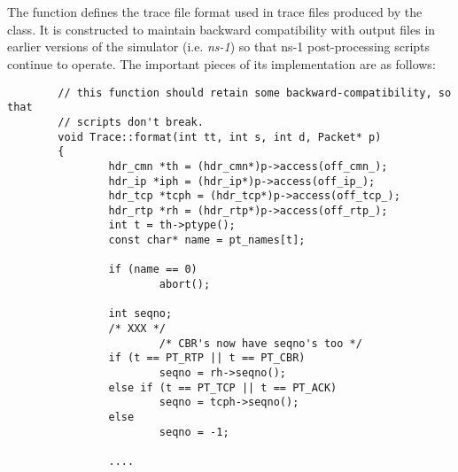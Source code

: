\section{}

The  function defines the trace file format used
in trace files produced by the  class.
It is constructed to maintain backward compatibility with output files
in earlier versions of the simulator (i.e. {\em ns-1}) so that ns-1
post-processing scripts continue to operate.
The important pieces of its implementation are as follows:
\begin{small}
\begin{verbatim}
        // this function should retain some backward-compatibility, so that
        // scripts don't break.
        void Trace::format(int tt, int s, int d, Packet* p)
        {
                hdr_cmn *th = (hdr_cmn*)p->access(off_cmn_);
                hdr_ip *iph = (hdr_ip*)p->access(off_ip_);
                hdr_tcp *tcph = (hdr_tcp*)p->access(off_tcp_);
                hdr_rtp *rh = (hdr_rtp*)p->access(off_rtp_);
                int t = th->ptype();
                const char* name = pt_names[t];

                if (name == 0)
                        abort();

                int seqno;
                /* XXX */
                        /* CBR's now have seqno's too */
                if (t == PT_RTP || t == PT_CBR)
                        seqno = rh->seqno();
                else if (t == PT_TCP || t == PT_ACK)
                        seqno = tcph->seqno();
                else
                        seqno = -1;

                ....



\end{verbatim}
\end{small}
